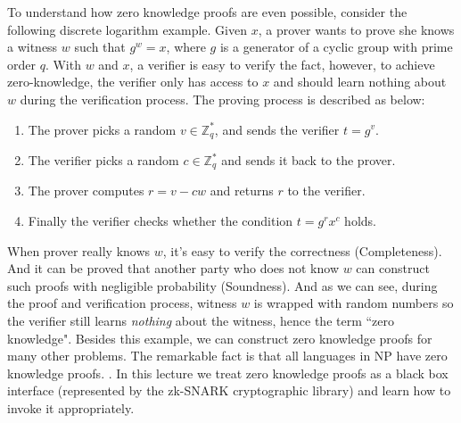 \documentclass[a4paper]{article}
\newcommand{\pramod}[1]{{\color{red}
\footnotesize[Pramod: #1] }}
\begin{document}
To understand how zero knowledge proofs are even possible, consider the following discrete logarithm example. Given $x$, a prover wants to prove she knows a witness $w$ such that $g^w = x$, where $g$ is a generator of a cyclic group with prime order $q$. With $w$ and $x$, a verifier is easy to verify the fact, however, to achieve zero-knowledge, the verifier only has access to $x$ and should learn nothing about $w$ during the verification process. The proving process is described as below:
\begin{enumerate}
    \item The prover picks a random $v\in \mathbb{Z}_q^{*}$, and sends the verifier $t = g^v$.
    \item The verifier picks a random $c\in \mathbb{Z}_q^{*}$ and sends it back to the prover.
    \item The prover computes $r=v-cw$ and returns $r$ to the verifier.
    \item Finally the verifier checks whether the condition $t=g^rx^c$ holds.
\end{enumerate}
When prover really knows $w$, it’s easy to verify the correctness (Completeness). And it can be proved that another party who does not know $w$ can construct such proofs with negligible probability (Soundness). And as we can see, during the proof and verification process, witness $w$ is wrapped with random numbers so the verifier still learns {\em nothing} about the witness, hence the term ``zero knowledge". Besides this example, we can construct zero knowledge proofs for many other problems. The remarkable fact is that all languages in NP have zero knowledge proofs. \cite{goldreich1986prove}.  In this lecture we  treat zero knowledge proofs as a black box interface (represented by the zk-SNARK cryptographic library) and learn how to invoke it appropriately.




\end{document}
